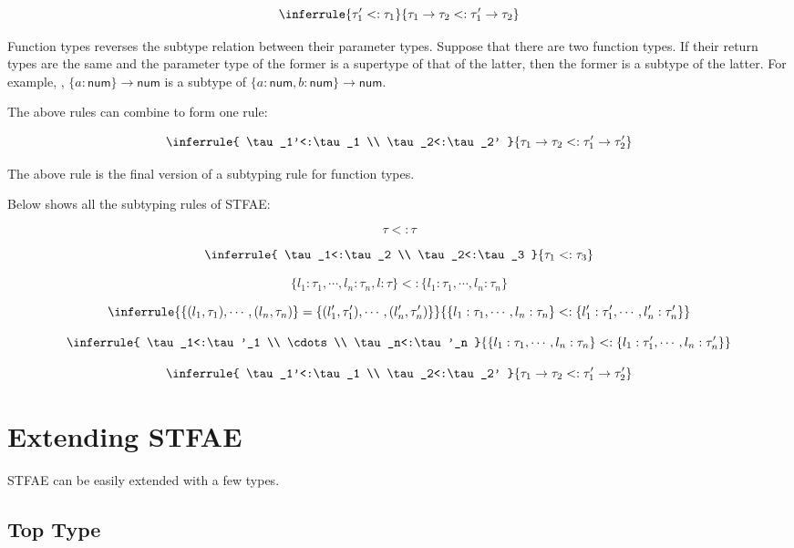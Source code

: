 \[
\inferrule
{ \tau_1'<:\tau_1 }
{ \tau_1\rightarrow\tau_2<:\tau_1'\rightarrow\tau_2 }
\]

Function types reverses the subtype relation between their parameter types.
Suppose that there are two function types. If their return types are the same
and the parameter type of the former is a supertype of that of the latter, then
the former is a subtype of the latter. For example, , \(\{a:\textsf{
num}\}\rightarrow\textsf{num}\) is a subtype of \(\{a:\textsf{num},b:\textsf{
num}\}\rightarrow\textsf{num}\).

The above rules can combine to form one rule:

\[
\inferrule
{ \tau_1'<:\tau_1 \\ \tau_2<:\tau_2' }
{ \tau_1\rightarrow\tau_2<:\tau_1'\rightarrow\tau_2' }
\]

The above rule is the final version of a subtyping rule for function types.

Below shows all the subtyping rules of STFAE:

\[\tau<:\tau\]

\[
\inferrule
{ \tau_1<:\tau_2 \\ \tau_2<:\tau_3 }
{ \tau_1<:\tau_3 }
\]

\[
\{l_1:\tau_1,\cdots,l_n:\tau_n,l:\tau\}<:\{l_1:\tau_1,\cdots,l_n:\tau_n\}
\]

\[
\inferrule
{ \{(l_1,\tau_1),\cdots,(l_n,\tau_n)\}=\{(l'_1,\tau'_1),\cdots,(l'_n,\tau'_n)\} }
{ \{l_1:\tau_1,\cdots,l_n:\tau_n\}<:\{l'_1:\tau'_1,\cdots,l'_n:\tau'_n\} }
\]

\[
\inferrule
{ \tau_1<:\tau'_1 \\ \cdots \\ \tau_n<:\tau'_n }
{ \{l_1:\tau_1,\cdots,l_n:\tau_n\}<:\{l_1:\tau'_1,\cdots,l_n:\tau'_n\} }
\]

\[
\inferrule
{ \tau_1'<:\tau_1 \\ \tau_2<:\tau_2' }
{ \tau_1\rightarrow\tau_2<:\tau_1'\rightarrow\tau_2' }
\]

\section{Extending STFAE}

STFAE can be easily extended with a few types.

\subsection{Top Type}

